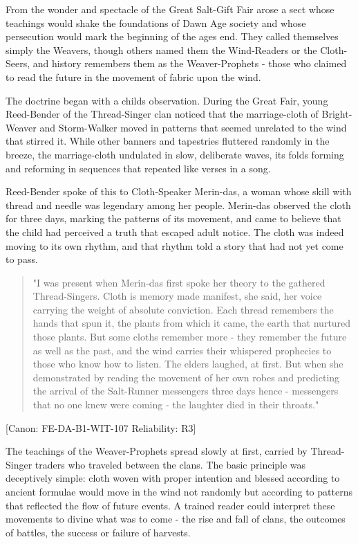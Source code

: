From the wonder and spectacle of the Great Salt-Gift Fair arose a sect
whose teachings would shake the foundations of Dawn Age society and
whose persecution would mark the beginning of the age\textquotesingle s
end. They called themselves simply the Weavers, though others named them
the Wind-Readers or the Cloth-Seers, and history remembers them as the
Weaver-Prophets - those who claimed to read the future in the movement
of fabric upon the wind.

The doctrine began with a child\textquotesingle s observation. During
the Great Fair, young Reed-Bender of the Thread-Singer clan noticed that
the marriage-cloth of Bright-Weaver and Storm-Walker moved in patterns
that seemed unrelated to the wind that stirred it. While other banners
and tapestries fluttered randomly in the breeze, the marriage-cloth
undulated in slow, deliberate waves, its folds forming and reforming in
sequences that repeated like verses in a song.

Reed-Bender spoke of this to Cloth-Speaker Merin-das, a woman whose
skill with thread and needle was legendary among her people. Merin-das
observed the cloth for three days, marking the patterns of its movement,
and came to believe that the child had perceived a truth that escaped
adult notice. The cloth was indeed moving to its own rhythm, and that
rhythm told a story that had not yet come to pass.

\begin{quote}
"I was present when Merin-das first spoke her theory to the gathered
Thread-Singers. \textquotesingle Cloth is memory made
manifest,\textquotesingle{} she said, her voice carrying the weight of
absolute conviction. \textquotesingle Each thread remembers the hands
that spun it, the plants from which it came, the earth that nurtured
those plants. But some cloths remember more - they remember the future
as well as the past, and the wind carries their whispered prophecies to
those who know how to listen.\textquotesingle{} The elders laughed, at
first. But when she demonstrated by reading the movement of her own
robes and predicting the arrival of the Salt-Runner messengers three
days hence - messengers that no one knew were coming - the laughter died
in their throats."
\end{quote}

{[}Canon: FE-DA-B1-WIT-107 \textbar{} Reliability: R3{]}

The teachings of the Weaver-Prophets spread slowly at first, carried by
Thread-Singer traders who traveled between the clans. The basic
principle was deceptively simple: cloth woven with proper intention and
blessed according to ancient formulae would move in the wind not
randomly but according to patterns that reflected the flow of future
events. A trained reader could interpret these movements to divine what
was to come - the rise and fall of clans, the outcomes of battles, the
success or failure of harvests.

